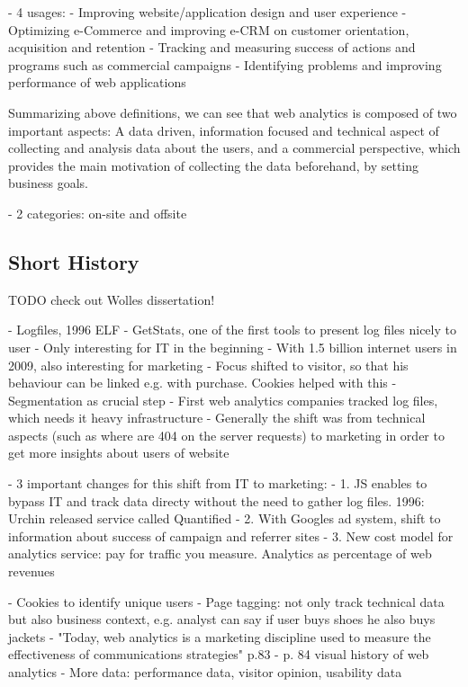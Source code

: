 - 4 usages:
- Improving website/application design and user experience
- Optimizing e-Commerce and improving e-CRM on customer orientation, acquisition and retention
- Tracking and measuring success of actions and programs such as commercial campaigns
- Identifying problems and improving performance of web applications

Summarizing above definitions, we can see that web analytics is composed of two important aspects: A data driven, information focused and technical aspect of collecting and analysis data about the users, and a commercial perspective, which provides the main motivation of collecting the data beforehand, by setting business goals.


- 2 categories: on-site and offsite



\subsection{Short History}

TODO check out Wolles dissertation!

- Logfiles, 1996 ELF
- GetStats, one of the first tools to present log files nicely to user
- Only interesting for IT in the beginning
- With 1.5 billion internet users in 2009, also interesting for marketing
- Focus shifted to visitor, so that his behaviour can be linked e.g. with purchase.  Cookies helped with this
- Segmentation as crucial step
- First web analytics companies tracked log files, which needs it heavy infrastructure
- Generally the shift was from technical aspects (such as where are 404 on the server requests) to marketing in order to get more insights about users of website

- 3 important changes for this shift from IT to marketing:
- 1.  JS enables to bypass IT and track data directy without the need to gather log files. 1996: Urchin released service called Quantified
- 2.  With Googles ad system, shift to information about success of campaign and referrer sites
- 3. New cost model for analytics service: pay for traffic you measure. Analytics as percentage of web revenues

- Cookies to identify unique users
- Page tagging: not only track technical data but also business context, e.g. analyst can say if user buys shoes he also buys jackets
- "Today, web analytics is a marketing discipline used to measure the effectiveness of communications strategies" p.83
- p. 84 visual history of web analytics
- More data: performance data, visitor opinion, usability data


